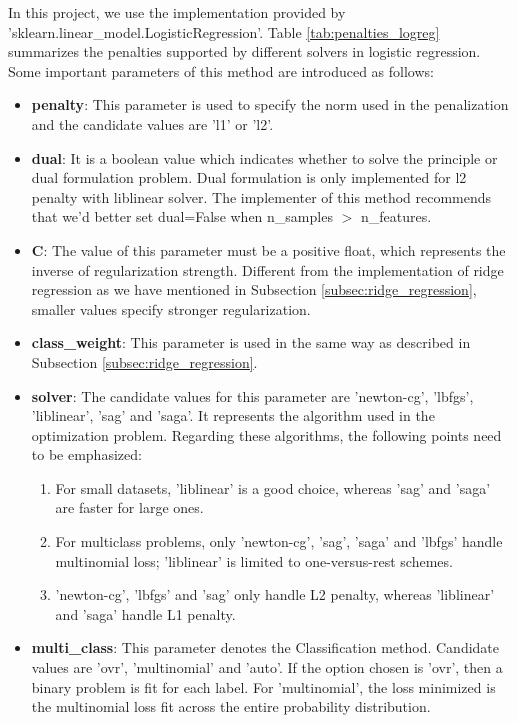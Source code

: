 \documentclass[10pt,journal,compsoc]{IEEEtran}
\begin{document}
In this project, we use the implementation provided by 'sklearn.linear\_model.LogisticRegression'. Table \ref{tab:penalties_logreg} summarizes the penalties supported by different solvers in logistic regression. Some important parameters of this method are introduced as follows:
\begin{itemize}
  \item \textbf{penalty}: This parameter is used to specify the norm used in the penalization and the candidate values are 'l1' or 'l2'.
  \item \textbf{dual}: It is a boolean value which indicates whether to solve the principle or dual formulation problem. Dual formulation is only implemented for l2 penalty with liblinear solver. The implementer of this method recommends that we'd better set dual=False when n\_samples $>$ n\_features.
  \item \textbf{C}: The value of this parameter must be a positive float, which represents the inverse of regularization strength. Different from the implementation of ridge regression as we have mentioned in Subsection \ref{subsec:ridge_regression}, smaller values specify stronger regularization.
  \item \textbf{class\_weight}: This parameter is used in the same way as described in Subsection \ref{subsec:ridge_regression}.
  \item \textbf{solver}: The candidate values for this parameter are 'newton-cg', 'lbfgs', 'liblinear', 'sag' and 'saga'. It represents the algorithm used in the optimization problem. Regarding these algorithms, the following points need to be emphasized:
    \begin{enumerate}
      \item For small datasets, 'liblinear' is a good choice, whereas 'sag' and 'saga' are faster for large ones.
      \item For multiclass problems, only 'newton-cg', 'sag', 'saga' and 'lbfgs' handle multinomial loss; 'liblinear' is limited to one-versus-rest schemes.
      \item 'newton-cg', 'lbfgs' and 'sag' only handle L2 penalty, whereas 'liblinear' and 'saga' handle L1 penalty.
    \end{enumerate}
  \item \textbf{multi\_class}: This parameter denotes the Classification method. Candidate values are 'ovr', 'multinomial' and 'auto'. If the option chosen is 'ovr', then a binary problem is fit for each label. For 'multinomial', the loss minimized is the multinomial loss fit across the entire probability distribution.
\end{itemize}
\end{document}
